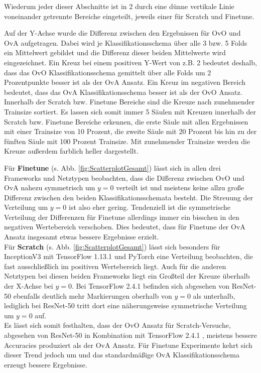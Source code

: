 Wiederum jeder dieser Abschnitte ist in 2 durch eine dünne vertikale Linie voneinander getrennte Bereiche eingeteilt, jeweils einer für Scratch und Finetune.

Auf der Y-Achse wurde die Differenz zwischen den Ergebnissen für OvO und OvA aufgetragen. Dabei wird je Klassifikationsschema über alle 3 bzw. 5 Folds ein Mittelwert gebildet und die Differenz dieser beiden Mittelwerte wird eingezeichnet. Ein Kreuz bei einem positiven Y-Wert von z.B. 2 bedeutet deshalb, dass das OvO Klassifikationsschema gemittelt über alle Folds um 2 Prozentpunkte besser ist als der OvA Ansatz. Ein Kreuz im negativen Bereich bedeutet, dass das OvA Klassifikationsschema besser ist als der OvO Ansatz.
Innerhalb der Scratch bzw. Finetune Bereiche sind die Kreuze nach zunehmender Trainsize sortiert. Es lassen sich somit immer 5 Säulen mit Kreuzen innerhalb der Scratch bzw. Finetune Bereiche erkennen, die erste Säule mit allen Ergebnissen mit einer Trainsize von 10 Prozent, die zweite Säule mit 20 Prozent bis hin zu der fünften Säule mit 100 Prozent Trainsize. Mit zunehmender Trainsize werden die Kreuze außerdem farblich heller dargestellt.


Für \textbf{Finetune} (s. Abb. \ref{fig:ScatterplotGesamt}) lässt sich in allen drei Frameworks und Netztypen beobachten, dass die Differenz zwischen OvO und OvA nahezu symmetrisch um $y=0$ verteilt ist und meistens keine allzu große Differenz zwischen den beiden Klassifikationsschemata besteht. Die Streuung der Verteilung um $y=0$ ist also eher gering.
Tendenziell ist die symmetrische Verteilung der Differenzen für Finetune allerdings immer ein bisschen in den negativen Wertebereich verschoben. Dies bedeutet, dass für Finetune der OvA Ansatz insgesamt etwas bessere Ergebnisse erzielt.\\

Für \textbf{Scratch} (s. Abb. \ref{fig:ScatterplotGesamt}) lässt sich besonders für InceptionV3 mit TensorFlow 1.13.1 \cite{tensorflow} und PyTorch \cite{pytorch} eine Verteilung beobachten, die fast ausschließlich im positiven Wertebereich liegt. Auch für die anderen Netztypen bei diesen beiden Frameworks liegt ein Großteil der Kreuze überhalb der X-Achse bei $y=0$. Bei TensorFlow 2.4.1 \cite{tensorflow} befinden sich abgesehen von ResNet-50 ebenfalls deutlich mehr Markierungen oberhalb von $y=0$ als unterhalb, lediglich bei ResNet-50 tritt dort eine näherungsweise symmetrische Verteilung um $y=0$ auf.\\

Es lässt sich somit festhalten, dass der OvO Ansatz für Scratch-Versuche, abgesehen von ResNet-50 in Kombination mit TensorFlow 2.4.1 \cite{tensorflow}, meistens bessere Accuracies produziert als der OvA Ansatz. Für Finetune Experimente kehrt sich dieser Trend jedoch um und das standardmäßige OvA Klassifikationsschema erzeugt bessere Ergebnisse.

